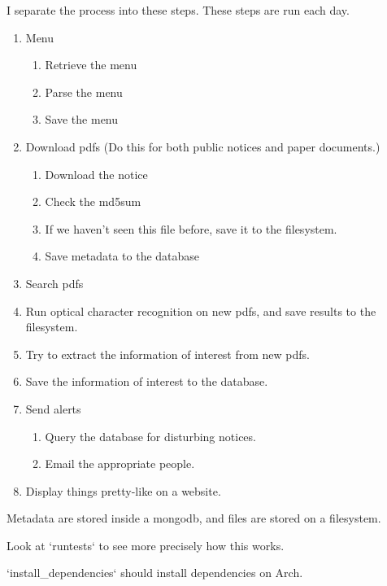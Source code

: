 I separate the process into these steps. These steps are run each day.

\begin{enumerate}
\item Menu
  \begin{enumerate}
  \item Retrieve the menu
  \item Parse the menu
  \item Save the menu
  \end{enumerate}
\item Download pdfs (Do this for both public notices and paper documents.)
  \begin{enumerate}
  \item Download the notice
  \item Check the md5sum
  \item If we haven't seen this file before, save it to the filesystem.
  \item Save metadata to the database
  \end{enumerate}
\item Search pdfs
  \item Run optical character recognition on new pdfs, and save results to the filesystem.
  \item Try to extract the information of interest from new pdfs.
  \item Save the information of interest to the database.
\item Send alerts
  \begin{enumerate}
  \item Query the database for disturbing notices.
  \item Email the appropriate people.
  \end{enumerate}
\item Display things pretty-like on a website.
\end{enumerate}

Metadata are stored inside a mongodb, and files are stored on a filesystem.

Look at `runtests` to see more precisely how this works.

`install_dependencies` should install dependencies on Arch.
